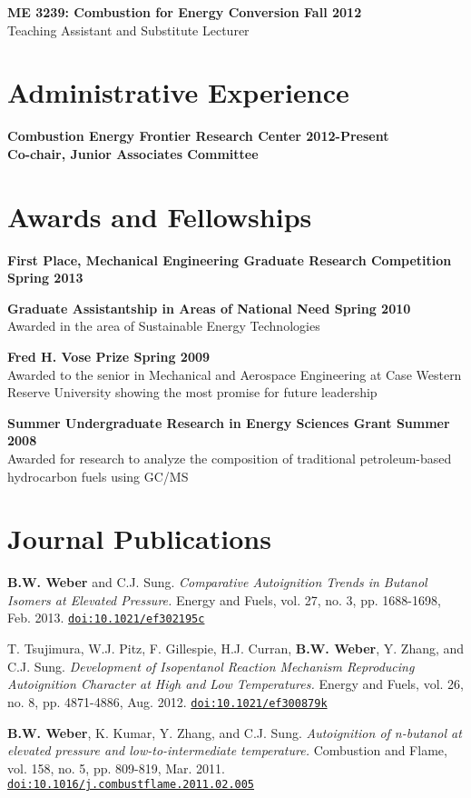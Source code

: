 \documentclass[margin,line]{res}
\newcommand*{\doi}[1]{\href{http://dx.doi.org/#1}{\nolinkurl{doi:#1}}}
\newenvironment{list3}{
  \begin{list}{\ding{113}}{%
      \setlength{\itemsep}{0.1in}
      \setlength{\parsep}{0in} \setlength{\parskip}{0in}
      \setlength{\topsep}{0in} \setlength{\partopsep}{0in} 
      \setlength{\leftmargin}{0in}}}{\end{list}}
\begin{document}
\begin{resume}
\begin{list3}
\item[]{\bf ME 3239: Combustion for Energy Conversion \hfill Fall 2012}\\
Teaching Assistant and Substitute Lecturer
\end{list3}

\section{\sc Administrative Experience}
{\bf Combustion Energy Frontier Research Center \hfill 2012-Present\\
Co-chair, Junior Associates Committee}

\section{\sc Awards and Fellowships}
{\bf First Place, Mechanical Engineering Graduate Research Competition \hfill Spring 2013}

{\bf Graduate Assistantship in Areas of National Need \hfill Spring 2010}\\
Awarded in the area of Sustainable Energy Technologies

{\bf Fred H. Vose Prize \hfill Spring 2009}\\
Awarded to the senior in Mechanical and Aerospace Engineering at Case Western Reserve University showing the most promise for future leadership

{\bf Summer Undergraduate Research in Energy Sciences Grant \hfill Summer 2008}\\
Awarded for research to analyze the composition of traditional petroleum-based hydrocarbon fuels using GC/MS

\section{\sc Journal Publications}
\begin{list3}
\item[] {\bf B.W. Weber} and C.J. Sung. {\em Comparative Autoignition Trends in Butanol Isomers at Elevated Pressure.} Energy and Fuels, vol. 27, no. 3, pp. 1688-1698, Feb. 2013. \doi{10.1021/ef302195c}
\item[] T. Tsujimura, W.J. Pitz, F. Gillespie, H.J. Curran, {\bf B.W. Weber}, Y. Zhang, and C.J. Sung. {\em Development of Isopentanol Reaction Mechanism Reproducing Autoignition Character at High and Low Temperatures.} Energy and Fuels, vol. 26, no. 8, pp. 4871-4886, Aug. 2012. \doi{10.1021/ef300879k}
\item[] {\bf B.W. Weber}, K. Kumar, Y. Zhang, and C.J. Sung. {\em Autoignition of n-butanol at elevated pressure and low-to-intermediate temperature.} Combustion and Flame, vol. 158, no. 5, pp. 809-819, Mar. 2011. \doi{10.1016/j.combustflame.2011.02.005}
\end{list3}


\end{resume}
\end{document}
